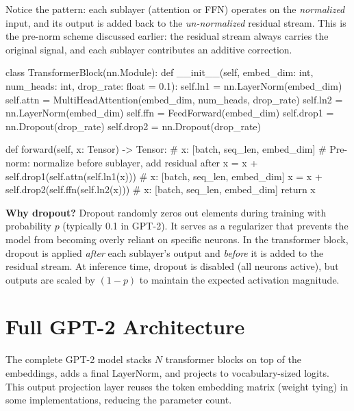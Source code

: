 Notice the pattern: each sublayer (attention or FFN) operates on the
\emph{normalized} input, and its output is added back to the
\emph{un-normalized} residual stream. This is the pre-norm scheme discussed
earlier: the residual stream always carries the original signal, and each
sublayer contributes an additive correction.

\begin{pseudocode}
class TransformerBlock(nn.Module):
    def __init__(self, embed_dim: int, num_heads: int, drop_rate: float = 0.1):
        self.ln1 = nn.LayerNorm(embed_dim)
        self.attn = MultiHeadAttention(embed_dim, num_heads, drop_rate)
        self.ln2 = nn.LayerNorm(embed_dim)
        self.ffn = FeedForward(embed_dim)
        self.drop1 = nn.Dropout(drop_rate)
        self.drop2 = nn.Dropout(drop_rate)

    def forward(self, x: Tensor) -> Tensor:
        # x: [batch, seq_len, embed_dim]
        # Pre-norm: normalize before sublayer, add residual after
        x = x + self.drop1(self.attn(self.ln1(x)))
        # x: [batch, seq_len, embed_dim]
        x = x + self.drop2(self.ffn(self.ln2(x)))
        # x: [batch, seq_len, embed_dim]
        return x
\end{pseudocode}

\begin{keyconcept}
  \textbf{Why dropout?} Dropout randomly zeros out elements during training with
  probability $p$ (typically 0.1 in GPT-2). It serves as a regularizer that
  prevents the model from becoming overly reliant on specific neurons. In the
  transformer block, dropout is applied \emph{after} each sublayer's output and
  \emph{before} it is added to the residual stream. At inference time, dropout
  is disabled (all neurons active), but outputs are scaled by $(1 - p)$ to
  maintain the expected activation magnitude.
\end{keyconcept}

\section{Full GPT-2 Architecture}

The complete GPT-2 model stacks $N$ transformer blocks on top of the
embeddings, adds a final LayerNorm, and projects to vocabulary-sized logits.
This output projection layer reuses the token embedding matrix (weight tying)
in some implementations, reducing the parameter count.

